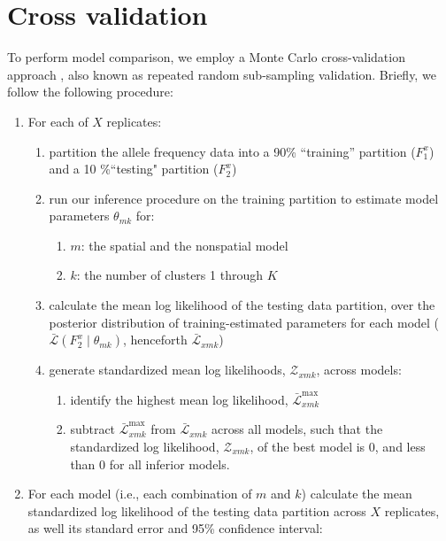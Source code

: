\documentclass[12pt]{article}
\begin{document}
\section{Cross validation}\label{Xvalidation}
To perform model comparison, we employ a Monte Carlo cross-validation approach \citep{picard1984},
also known as repeated random sub-sampling validation.
Briefly, we follow the following procedure:
\begin{enumerate}
\item For each of $X$ replicates:
	\begin{enumerate}
		\item partition the allele frequency data into a 90\% ``training'' partition ($F^x_1$) and a 10 \%``testing" partition ($F^x_2$) \label{partition}
		\item run our inference procedure on the training partition to estimate model parameters $\theta_{mk}$ for: \label{inference}
			\begin{enumerate}
				\item $m$: the spatial and the nonspatial model
				\item $k$: the number of clusters 1 through $K$
			\end{enumerate}	
	\item calculate the mean log likelihood of the testing data partition, 
	over the posterior distribution of training-estimated parameters for each model 
	($\bar{\mathcal{L}}(F^x_2 \mid \theta_{mk})$, henceforth $\bar{\mathcal{L}}_{xmk}$) \label{lnL}
	\item generate standardized mean log likelihoods, $\mathcal{Z}_{xmk}$, across models: \label{standardize}
		\begin{enumerate}
			\item identify the highest mean log likelihood, $\bar{\mathcal{L}}^\text{max}_{xmk}$
			\item subtract $\bar{\mathcal{L}}^\text{max}_{xmk}$ from $\bar{\mathcal{L}}_{xmk}$ across all models,
				such that the standardized log likelihood, $\mathcal{Z}_{xmk}$, of the best model is 0,
				and less than 0 for all inferior models. 
		\end{enumerate}
	\end{enumerate}
\item For each model (i.e., each combination of $m$ and $k$) calculate 
	the mean standardized log likelihood of the testing data partition across $X$ replicates, 
	as well its standard error and 95\% confidence interval:
	\begin{enumerate}

\end{enumerate}
\end{enumerate}
\end{document}
